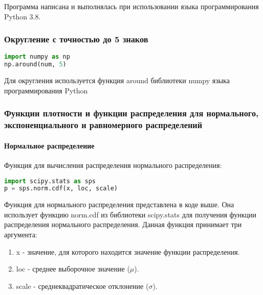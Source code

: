 Программа написана и выполнялась при использовании языка программирования Python 3.8.

\subsubsection{Округление с точностью до 5 знаков}
\begin{lstlisting}[language=Python]
import numpy as np
np.around(num, 5)
\end{lstlisting}

Для округления используется функция around библиотеки numpy языка программирования Python




%


\subsubsection{Функции плотности и функции распределения для нормального, экспоненциального и равномерного распределений}

\paragraph{Нормальное распределение}

Функция для вычисления распределения нормального распределения:
\begin{lstlisting}[language=Python]
import scipy.stats as sps
p = sps.norm.cdf(x, loc, scale)
\end{lstlisting}

Функция для нормального распределения представлена в коде выше. 
Она использует функцию norm.cdf из библиотеки scipy.stats для получения функции распределения нормального распределения. 
Данная функция принимает три аргумента:
\begin{enumerate}
    \item x - значение, для которого находится значение функции распределения.
    \item loc - среднее выборочное значение ($\mu$).
    \item scale - среднеквадратическое отклонение ($\sigma$).
\end{enumerate}

